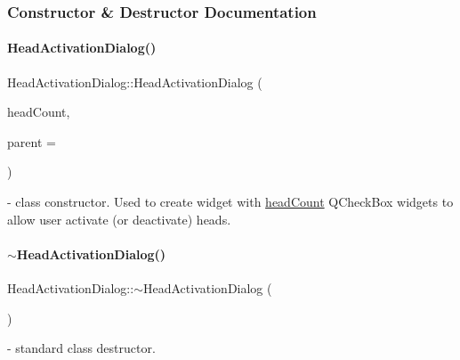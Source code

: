 \subsubsection{Constructor \& Destructor Documentation}
\mbox{\label{classHeadActivationDialog_aa8af7af33f3feac8547580e4c9bac577}} 
\paragraph{\texorpdfstring{Head\+Activation\+Dialog()}{HeadActivationDialog()}}
{\footnotesize\ttfamily Head\+Activation\+Dialog\+::\+Head\+Activation\+Dialog (\begin{DoxyParamCaption}\item[{int}]{head\+Count,  }\item[{Q\+Widget $\ast$}]{parent = {} }\end{DoxyParamCaption}){\ttfamily [explicit]}} - class constructor. Used to create widget with \hyperlink{classHeadActivationDialog_a0403b31877ebf58f738b9bfa68d31434}{head\+Count} Q\+Check\+Box widgets to allow user activate (or deactivate) heads.

\mbox{\label{classHeadActivationDialog_a277a05013a9304f1fc07ea89576e7b3d}} 
\paragraph{\texorpdfstring{$\sim$\+Head\+Activation\+Dialog()}{~HeadActivationDialog()}}
{\footnotesize\ttfamily Head\+Activation\+Dialog\+::$\sim$\+Head\+Activation\+Dialog (\begin{DoxyParamCaption}{ }\end{DoxyParamCaption})} - standard class destructor.



